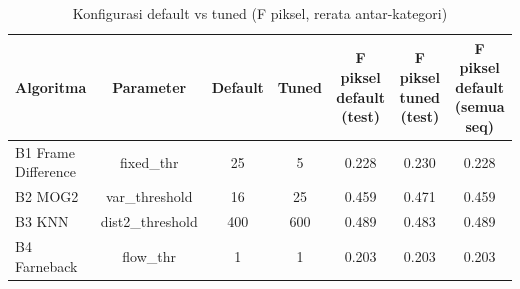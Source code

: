 \begin{table}[t]
\centering
\caption{Konfigurasi default vs tuned (F piksel, rerata antar-kategori)}
\label{tab:table_default_vs_tuned}
\begin{tabular}{lcccccc}
\toprule
Algoritma & Parameter & Default & Tuned & F piksel default (test) & F piksel tuned (test) & F piksel default (semua seq) \\
\midrule
B1 Frame Difference & fixed\_thr & 25 & 5 & 0.228 & 0.230 & 0.228 \\
B2 MOG2 & var\_threshold & 16 & 25 & 0.459 & 0.471 & 0.459 \\
B3 KNN & dist2\_threshold & 400 & 600 & 0.489 & 0.483 & 0.489 \\
B4 Farneback & flow\_thr & 1 & 1 & 0.203 & 0.203 & 0.203 \\
\bottomrule
\end{tabular}
\end{table}

